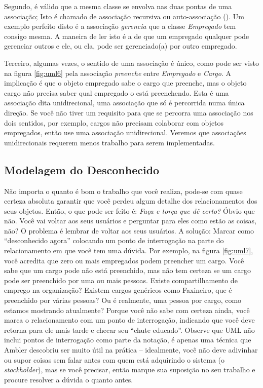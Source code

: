 \documentclass[
	11pt,				%
	openright,
	twoside,			%
	a4paper,			%
	english,			%
	french,
	brazil,				%
	sumario=tradicional
	]{abntex2}
\begin{document}
Segundo, é válido que a mesma classe se envolva nas duas pontas de uma associação; Isto é chamado de associação recursiva ou auto-associação (). Um exemplo perfeito disto é a associação \emph{gerencia} que a classe \emph{Empregado} tem consigo mesma. A maneira de ler isto é a de que um empregado qualquer pode gerenciar outros e ele, ou ela, pode ser gerenciado(a) por outro empregado.

Terceiro, algumas vezes, o sentido de uma associação é único, como pode ser visto na figura \ref{fig:uml6} pela associação \emph{preenche} entre \emph{Empregado} e \emph{Cargo}. A implicação é que o objeto empregado sabe o cargo que preenche, mas o objeto cargo não precisa saber qual empregado o está preenchendo. Esta é uma associação dita unidirecional, uma associação que só é percorrida numa única direção. Se você não tiver um requisito para que se percorra uma associação nos dois sentidos, por exemplo, cargos não precisam colaborar com objetos empregados, então use uma associação unidirecional. Veremos que associações unidirecionais requerem menos trabalho para serem implementadas.

\subsection{Modelagem do Desconhecido}

Não importa o quanto é bom o trabalho que você realiza, pode-se com quase certeza absoluta garantir que você perdeu algum detalhe dos relacionamentos dos seus objetos. Então, o que pode ser feito é: \textit{Faça e torça que dê certo?} Óbvio que não. Você vai voltar aos seus usuários e perguntar para eles como estão as coisas, não? O problema é lembrar de voltar aos seus usuários. A solução: Marcar como ``desconhecido agora'' colocando um ponto de interrogação na parte do relacionamento em que você tem uma dúvida. Por exemplo, na figura \ref{fig:uml7}, você acredita que zero ou mais empregados podem preencher um cargo. Você sabe que um cargo pode não está preenchido, mas não tem certeza se um cargo pode ser preenchido por uma ou mais pessoas. Existe compartilhamento de emprego na organização? Existem cargos genéricos como Faxineiro, que é preenchido por várias pessoas? Ou é realmente, uma pessoa por cargo, como estamos mostrando atualmente? Porque você não sabe com certeza ainda, você marca o relacionamento com um ponto de interrogação, indicando que você deve retorna para ele mais tarde e checar seu ``chute educado''. Observe que UML não inclui pontos de interrogação como parte da notação, é apenas uma técnica que Ambler descobriu ser muito útil na prática -- idealmente, você não deve adivinhar ou supor coisas sem falar antes com quem está adquirindo o sistema (o \textit{stockholder}), mas se você precisar, então marque sua suposição no seu trabalho e procure resolver a dúvida o quanto antes.
\end{document}
